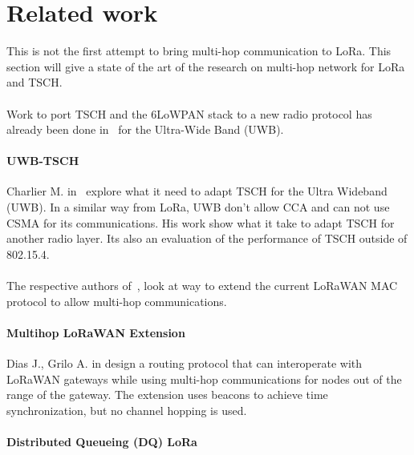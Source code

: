 \section{Related work}

This is not the first attempt to bring multi-hop communication to LoRa.
This section will give a state of the art of the research on
multi-hop network for LoRa and TSCH.

\paragraph{}

Work to port TSCH and the 6LoWPAN stack to a new radio protocol has already 
been done in~\cite{uwbtsch} for the Ultra-Wide Band (UWB).


\paragraph{UWB-TSCH}

Charlier M. in~\cite{uwbtsch} explore what it need to adapt TSCH for the Ultra
Wideband (UWB). 
In a similar way from LoRa, UWB don't allow CCA and can not use CSMA for its 
communications.
His work show what it take to adapt TSCH for another radio layer. 
Its also an evaluation of the performance of TSCH outside of 802.15.4.

\paragraph{}

The respective authors of~\cite{DIAS2018424, 8856256}, look at way to extend
the current LoRaWAN MAC protocol to allow multi-hop communications.

\paragraph{Multihop LoRaWAN Extension} Dias J., Grilo A. in \cite{DIAS2018424}
design a routing protocol that can interoperate with LoRaWAN gateways while
using multi-hop communications for nodes out of the range of the gateway.  
The extension uses beacons to achieve time synchronization, but no channel
hopping is used.

\paragraph{Distributed Queueing (DQ) LoRa}

